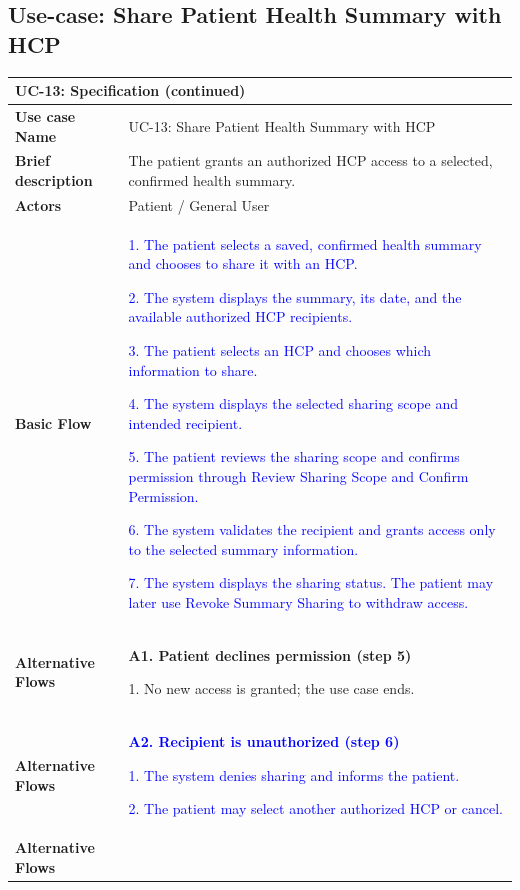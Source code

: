 \subsection{Use-case: Share Patient Health Summary with HCP}
\label{uc:uc-13}
\begin{longtable}{|p{}|p{}|}
\hline
\endfirsthead
\multicolumn{2}{l}{\textbf{UC-13: Specification (continued)}}\\
\hline
\endhead
\textbf{Use case Name} & UC-13: Share Patient Health Summary with HCP \\ \hline
\textbf{Brief description} &
The patient grants an authorized HCP access to a selected, confirmed health summary.
\\ \hline
\textbf{Actors} & Patient / General User \\ \hline
\textbf{Basic Flow} &
\textcolor{blue}{1. The patient selects a saved, confirmed health summary and chooses to share it with an HCP.}\par
\textcolor{blue}{2. The system displays the summary, its date, and the available authorized HCP recipients.}\par
\textcolor{blue}{3. The patient selects an HCP and chooses which information to share.}\par
\textcolor{blue}{4. The system displays the selected sharing scope and intended recipient.}\par
\textcolor{blue}{5. The patient reviews the sharing scope and confirms permission through Review Sharing Scope and Confirm Permission.}\par
\textcolor{blue}{6. The system validates the recipient and grants access only to the selected summary information.}\par
\textcolor{blue}{7. The system displays the sharing status. The patient may later use Revoke Summary Sharing to withdraw access.}
\\ \hline
\textbf{Alternative Flows} &
\textbf{A1. Patient declines permission (step 5)}\par
1. No new access is granted; the use case ends.
\\ \hline
\textbf{Alternative Flows} &
\textcolor{blue}{\textbf{A2. Recipient is unauthorized (step 6)}}\par
\textcolor{blue}{1. The system denies sharing and informs the patient.}\par
\textcolor{blue}{2. The patient may select another authorized HCP or cancel.}
\\ \hline
\textbf{Alternative Flows} &

\end{longtable}
